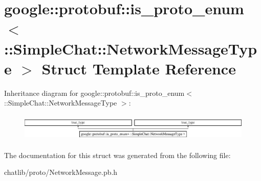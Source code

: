\hypertarget{structgoogle_1_1protobuf_1_1is__proto__enum_3_01_1_1SimpleChat_1_1NetworkMessageType_01_4}{\section{google\-:\-:protobuf\-:\-:is\-\_\-proto\-\_\-enum$<$ \-:\-:Simple\-Chat\-:\-:Network\-Message\-Type $>$ Struct Template Reference}
\label{structgoogle_1_1protobuf_1_1is__proto__enum_3_01_1_1SimpleChat_1_1NetworkMessageType_01_4}
}
Inheritance diagram for google\-:\-:protobuf\-:\-:is\-\_\-proto\-\_\-enum$<$ \-:\-:Simple\-Chat\-:\-:Network\-Message\-Type $>$\-:\begin{figure}[H]
\begin{center}
\leavevmode
\includegraphics[height=1.323877cm]{structgoogle_1_1protobuf_1_1is__proto__enum_3_01_1_1SimpleChat_1_1NetworkMessageType_01_4}
\end{center}
\end{figure}


The documentation for this struct was generated from the following file\-:\begin{DoxyCompactItemize}
\item 
chatlib/proto/Network\-Message.\-pb.\-h\end{DoxyCompactItemize}
